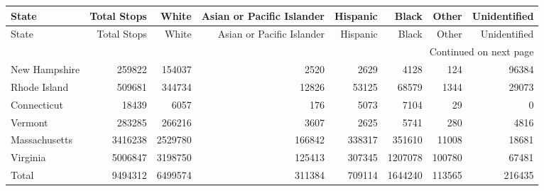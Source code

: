 \begin{longtable}{lrrrrrrr}
\toprule
        State &  Total Stops &   White &  Asian or Pacific Islander &  Hispanic &   Black &  Other &  Unidentified \\
\midrule
\endfirsthead

\toprule
        State &  Total Stops &   White &  Asian or Pacific Islander &  Hispanic &   Black &  Other &  Unidentified \\
\midrule
\endhead
\midrule
\multicolumn{8}{r}{{Continued on next page}} \\
\midrule
\endfoot

\bottomrule
\endlastfoot
New Hampshire &       259822 &  154037 &                       2520 &      2629 &    4128 &    124 &         96384 \\
 Rhode Island &       509681 &  344734 &                      12826 &     53125 &   68579 &   1344 &         29073 \\
  Connecticut &        18439 &    6057 &                        176 &      5073 &    7104 &     29 &             0 \\
      Vermont &       283285 &  266216 &                       3607 &      2625 &    5741 &    280 &          4816 \\
Massachusetts &      3416238 & 2529780 &                     166842 &    338317 &  351610 &  11008 &         18681 \\
     Virginia &      5006847 & 3198750 &                     125413 &    307345 & 1207078 & 100780 &         67481 \\
        Total &      9494312 & 6499574 &                     311384 &    709114 & 1644240 & 113565 &        216435 \\
\end{longtable}
